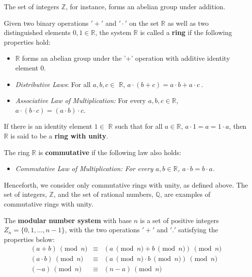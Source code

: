 The set of integers $\mathbb{Z}$, for instance, forms an abelian group under addition. 


\begin{Definition}
Given two binary operations $'+'$ and $'\cdot'$ on the set $\mathbb{R}$ as well
as two distinguished elements $0, 1 \in \mathbb{R}$, the system $\mathbb{R}$ is called
a {\bf ring} if the following properties hold:
	
\begin{itemize}
\item $\mathbb{R}$ forms an abelian group under the '+' operation with additive identity element $0$.
\item {\it Distributive Laws}: For all $a, b, c \in$ $\mathbb{R}$, $a\cdot (b+c) = a\cdot b + a\cdot c~$.
\item {\it Associative Law of Multiplication:} For every $a, b, c\in \mathbb{R}$, $a\cdot (b\cdot c) = (a\cdot b)\cdot c$. 
\end{itemize}
\end{Definition}

If there is an identity element $1 \in$ $\mathbb{R}$ such that for all $a \in \mathbb{R}$, $a\cdot 1 = a =1\cdot a$, 
then $\mathbb{R}$ is said to be a {\bf ring with unity}. 

The ring $\mathbb{R}$ is {\bf commutative} if the following law also holds:
\begin{itemize}
\item {\it Commutative Law of Multiplication: For every $a,b \in \mathbb{R}$, $a\cdot b = b\cdot a$.}
\end{itemize}

Henceforth, we consider only commutative rings with unity, as defined above. The
set of integers, $\mathbb{Z}$, and the set of rational numbers, $\mathbb{Q}$, are
examples of commutative rings with unity. 

\begin{Definition}
The {\bf modular number system} with base $n$ is a set of positive
integers $Z_n = \{0, 1, \ldots, n-1\}$, with the two operations $'+'$
and $'.'$ satisfying the properties below:
\begin{eqnarray}
(a + b) ~\pmod { n } &\equiv& (a ~\pmod {n} + b ~\pmod {n}) ~\pmod {n} \\
(a\cdot b) ~\pmod {n} &\equiv& (a ~\pmod {n} \cdot b ~\pmod {n}) ~\pmod {n} \label{eq:modmult}\\
(-a) ~\pmod {n} &\equiv& (n-a) ~\pmod {n} 
\end{eqnarray}
\end{Definition}


